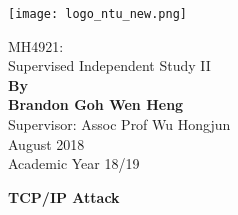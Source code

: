 \documentclass[a4paper,12pt]{article}
\begin{document}
	\begin{titlepage}
		\begin{center}
			\texttt{[image: logo\_ntu\_new.png]}
			\vspace*{7em}
			
			
			\Huge MH4921:\\Supervised Independent Study II\\		
			\LARGE
			\vspace{2cm}
			\textbf{By\\ Brandon Goh Wen Heng}\\\vspace{2cm}
			Supervisor: Assoc Prof Wu Hongjun
			\\\vspace{2cm}August 2018\\
			Academic Year 18/19\\\vspace{1.2cm}
			
			\vfill
		\end{center}
	\end{titlepage}




\begin{titlepage}
		\begin{center}
		\vspace*{27em}
		\Huge
			\textbf{TCP/IP Attack}\\		
			\vfill
		\end{center}
	\end{titlepage}
	
	\newpage
\end{document}
